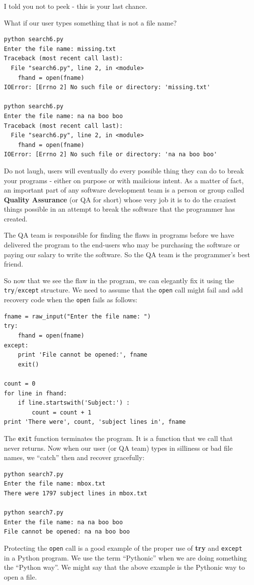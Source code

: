 \documentclass[10pt]{book}
\begin{document}
I told you not to peek - this is your last chance.

What if our user types something that is not a file name?
\beforeverb
\begin{verbatim}
python search6.py 
Enter the file name: missing.txt
Traceback (most recent call last):
  File "search6.py", line 2, in <module>
    fhand = open(fname)
IOError: [Errno 2] No such file or directory: 'missing.txt'

python search6.py 
Enter the file name: na na boo boo
Traceback (most recent call last):
  File "search6.py", line 2, in <module>
    fhand = open(fname)
IOError: [Errno 2] No such file or directory: 'na na boo boo'
\end{verbatim}
\afterverb
%
Do not laugh, users will eventually do every possible thing they can do 
to break your programs - either on purpose or with mailcious intent.
As a matter of fact, an important part of any software development
team is a person or group called {\bf Quality Assurance} (or QA for short)
whose very job it is to do the craziest things possible in an attempt
to break the software that the programmer has created.

The QA team is responsible for finding the flaws in programs before 
we have delivered the program to the end-users who may be purchasing the
software or paying our salary to write the software.  So the QA team
is the programmer's best friend.

So now that we see the flaw in the program, we can elegantly fix it using
the {\tt try}/{\tt except} structure.  We need to assume that the {\tt open}
call might fail and add recovery code when the {\tt open} fails
as follows:

\beforeverb
\begin{verbatim}
fname = raw_input("Enter the file name: ")
try:
    fhand = open(fname)
except:
    print 'File cannot be opened:', fname
    exit()

count = 0
for line in fhand:
    if line.startswith('Subject:') : 
        count = count + 1
print 'There were', count, 'subject lines in', fname
\end{verbatim}
\afterverb
%
The {\tt exit} function terminates the program.  It is a function
that we call that never returns.  Now when our user (or 
QA team) types in silliness or bad file names, 
we ``catch'' then and recover gracefully:
\beforeverb
\begin{verbatim}
python search7.py
Enter the file name: mbox.txt
There were 1797 subject lines in mbox.txt

python search7.py
Enter the file name: na na boo boo
File cannot be opened: na na boo boo
\end{verbatim}
\afterverb
%
Protecting the {\tt open} call is a good example 
of the proper use of {\bf try}
and {\tt except} in a Python program.  We use the term
``Pythonic'' when we are doing something the ``Python
way''.  We might say that the above example is 
the Pythonic way to open a file.
\end{document}
